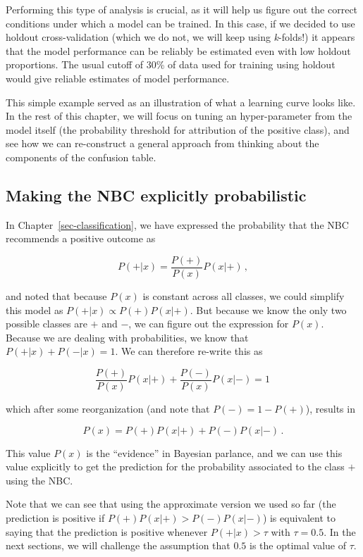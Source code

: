 \documentclass[
  letterpaper,
]{scrbook}
\begin{document}
Performing this type of analysis is crucial, as it will help us figure
out the correct conditions under which a model can be trained. In this
case, if we decided to use holdout cross-validation (which we do not, we
will keep using \emph{k}-folds!) it appears that the model performance
can be reliably be estimated even with low holdout proportions. The
usual cutoff of 30\% of data used for training using holdout would give
reliable estimates of model performance.

This simple example served as an illustration of what a learning curve
looks like. In the rest of this chapter, we will focus on tuning an
hyper-parameter from the model itself (the probability threshold for
attribution of the positive class), and see how we can re-construct a
general approach from thinking about the components of the confusion
table.

\subsection{Making the NBC explicitly
probabilistic}\label{sec-learningcurves-probabilistic}

In Chapter~\ref{sec-classification}, we have expressed the probability
that the NBC recommends a positive outcome as

\[
    P(+|x) = \frac{P(+)}{P(x)}P(x|+)\,,
\]

and noted that because \(P(x)\) is constant across all classes, we could
simplify this model as \(P(+|x) \propto P(+)P(x|+)\). But because we
know the only two possible classes are \(+\) and \(-\), we can figure
out the expression for \(P(x)\). Because we are dealing with
probabilities, we know that \(P(+|x)+P(-|x) = 1\). We can therefore
re-write this as

\[
\frac{P(+)}{P(x)}P(x|+)+\frac{P(-)}{P(x)}P(x|-) = 1\,
\]

which after some reorganization (and note that \(P(-) = 1-P(+)\)),
results in

\[
P(x) = P(+) P(x|+)+P(-) P(x|-) \,.
\]

This value \(P(x)\) is the ``evidence'' in Bayesian parlance, and we can
use this value explicitly to get the prediction for the probability
associated to the class \(+\) using the NBC.

Note that we can see that using the approximate version we used so far
(the prediction is positive if \(P(+) P(x|+) > P(-) P(x|-)\)) is
equivalent to saying that the prediction is positive whenever
\(P(+|x) > \tau\) with \(\tau = 0.5\). In the next sections, we will
challenge the assumption that \(0.5\) is the optimal value of \(\tau\).
\end{document}
